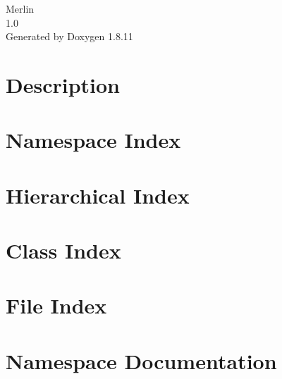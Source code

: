 \documentclass[twoside]{book}
\newcommand{\+}{\discretionary{\mbox{\scriptsize$\hookleftarrow$}}{}{}}
\newcommand{\clearemptydoublepage}{%
  \newpage{\pagestyle{empty}\cleardoublepage}%
}
\begin{document}
\hypersetup{pageanchor=false,
             bookmarksnumbered=true,
             pdfencoding=unicode
            }
\begin{titlepage}
\vspace*{7cm}
\begin{center}%
{\Large Merlin \\[1ex]\large 1.\+0 }\\
\vspace*{1cm}
{\large Generated by Doxygen 1.8.11}\\
\end{center}
\end{titlepage}
\clearemptydoublepage
\tableofcontents
\clearemptydoublepage
{}
\hypersetup{pageanchor=true}

\chapter{Description}
\label{md_README}
\hypertarget{md_README}{}

\chapter{Namespace Index}

\chapter{Hierarchical Index}

\chapter{Class Index}

\chapter{File Index}

\chapter{Namespace Documentation}

\end{document}
